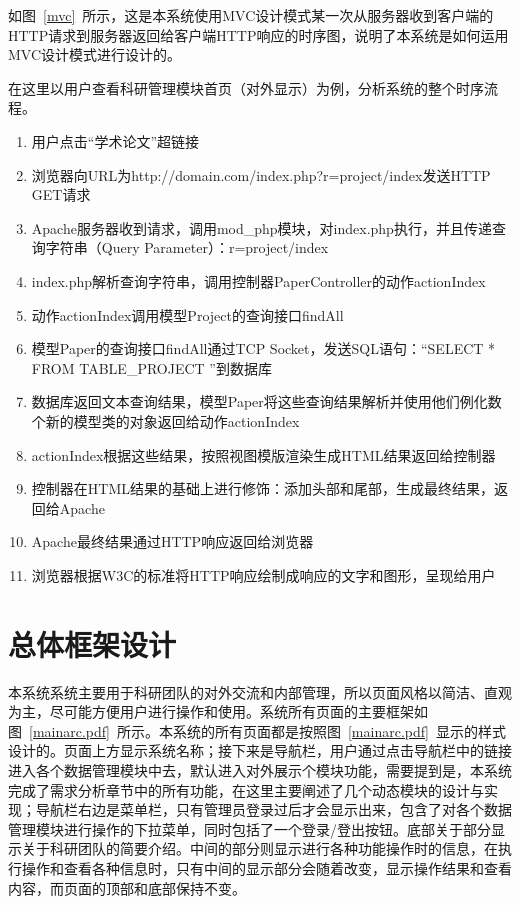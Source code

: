 如图~\ref{mvc}~所示，这是本系统使用MVC设计模式某一次从服务器收到客户端的HTTP请求到服务器返回给客户端HTTP响应的时序图，说明了本系统是如何运用MVC设计模式进行设计的。

在这里以用户查看科研管理模块首页（对外显示）为例，分析系统的整个时序流程。
\begin{enumerate}
\item 用户点击“学术论文”超链接
\item 浏览器向URL为http://domain.com/index.php?r=project/index发送HTTP GET请求
\item Apache服务器收到请求，调用mod\_php模块，对index.php执行，并且传递查询字符串（Query Parameter）：r=project/index
\item index.php解析查询字符串，调用控制器PaperController的动作actionIndex
\item 动作actionIndex调用模型Project的查询接口findAll
\item 模型Paper的查询接口findAll通过TCP Socket，发送SQL语句：“SELECT * FROM TABLE\_PROJECT ”到数据库
\item 数据库返回文本查询结果，模型Paper将这些查询结果解析并使用他们例化数个新的模型类的对象返回给动作actionIndex
\item actionIndex根据这些结果，按照视图模版渲染生成HTML结果返回给控制器
\item 控制器在HTML结果的基础上进行修饰：添加头部和尾部，生成最终结果，返回给Apache
\item Apache最终结果通过HTTP响应返回给浏览器
\item 浏览器根据W3C的标准将HTTP响应绘制成响应的文字和图形，呈现给用户 
\end{enumerate}

\section{总体框架设计}

本系统系统主要用于科研团队的对外交流和内部管理，所以页面风格以简洁、直观为主，尽可能方便用户进行操作和使用。系统所有页面的主要框架如图~\ref{mainarc.pdf}~所示。本系统的所有页面都是按照图~\ref{mainarc.pdf}~显示的样式设计的。页面上方显示系统名称；接下来是导航栏，用户通过点击导航栏中的链接进入各个数据管理模块中去，默认进入对外展示个模块功能，需要提到是，本系统完成了需求分析章节中的所有功能，在这里主要阐述了几个动态模块的设计与实现；导航栏右边是菜单栏，只有管理员登录过后才会显示出来，包含了对各个数据管理模块进行操作的下拉菜单，同时包括了一个登录/登出按钮。底部关于部分显示关于科研团队的简要介绍。中间的部分则显示进行各种功能操作时的信息，在执行操作和查看各种信息时，只有中间的显示部分会随着改变，显示操作结果和查看内容，而页面的顶部和底部保持不变。

